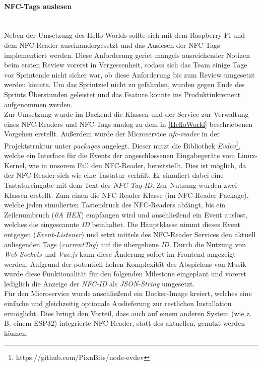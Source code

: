 \documentclass[10pt, a4paper]{article}
\begin{document}
\begin{onehalfspace}
\paragraph*{NFC-Tags auslesen} $~$ \\
Neben der Umsetzung des Hello-Worlds sollte sich mit dem Raspberry Pi und dem NFC-Reader auseinandergesetzt und das Auslesen der NFC-Tags implementiert werden. Diese Anforderung geriet mangels ausreichender Notizen beim ersten Review vorerst
in Vergessenheit, sodass sich das Team einige Tage vor Sprintende nicht sicher war, ob diese Anforderung bis zum Review umgesetzt werden könnte.
Um das Sprintziel nicht zu gefährden, wurden gegen Ende des Sprints Überstunden geleistet und das Feature konnte ins Produktinkrement aufgenommen werden.
\\
Zur Umsetzung wurde im Backend die Klassen und der Service zur Verwaltung eines NFC-Readers und NFC-Tags
analog zu dem in \autoref{HelloWorld} beschriebenen Vorgehen erstellt.
Außerdem wurde der Microservice \textit{nfc-reader} in der Projektstruktur unter \textit{packages}
angelegt. Dieser nutzt die Bibliothek \textit{Evdev}\footnote{https://github.com/PixnBits/node-evdev}, welche ein Interface für die Events der angeschlossenen
Eingabegeräte vom Linux-Kernel, wie in unserem Fall den NFC-Reader, bereitstellt. Dies ist möglich, da der NFC-Reader sich wie eine Tastatur verhält. Er
simuliert dabei eine Tastatureingabe mit dem Text der \textit{NFC-Tag-ID}. Zur Nutzung wurden zwei Klassen erstellt. Zum einen die NFC-Reader Klasse
(im NFC-Reader Package), welche jeden simulierten Tastendruck des NFC-Readers abfängt, bis ein Zeilenumbruch (\textit{0A HEX}) empfangen
wird und anschließend ein Event auslöst, welches die eingescannte \textit{ID} beinhaltet. Die Hauptklasse nimmt dieses Event entgegen (\textit{Event-Listener}) und setzt mittels des
NFC-Reader Services den aktuell anliegenden Tags (\textit{currentTag}) auf die übergebene \textit{ID}. Durch die Nutzung von \textit{Web-Sockets} und \textit{Vue.js}
kann diese Änderung sofort im Frontend angezeigt werden. Aufgrund der potentiell hohen Komplexität des Abspielens von Musik wurde diese Funktionalität für den
folgenden Milestone eingeplant und vorerst lediglich die Anzeige der \textit{NFC-ID} als \textit{JSON-String} umgesetzt.
\\
Für den Microservice wurde anschließend ein Docker-Image kreiert, welches eine einfache und gleichzeitig optionale Auslieferung zur restlichen Installation
ermöglicht. Dies bringt den Vorteil, dass auch auf einem anderen System (wie z. B. einem ESP32) integrierte NFC-Reader, statt des aktuellen, genutzt werden können.


\end{onehalfspace}
\end{document}
